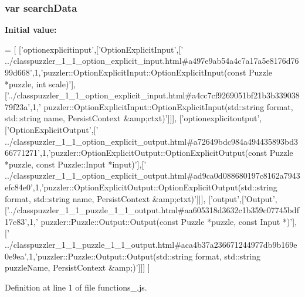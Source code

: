 \subsubsection[{search\+Data}]{\setlength{\rightskip}{0pt plus 5cm}var search\+Data}\label{a00091_ad01a7523f103d6242ef9b0451861231e}
{\bfseries Initial value\+:}
\begin{DoxyCode}
=
[
  [\textcolor{stringliteral}{'optionexplicitinput'},[\textcolor{stringliteral}{'OptionExplicitInput'},[\textcolor{stringliteral}{'
      ../classpuzzler\_1\_1\_option\_explicit\_input.html#a497e9ab54a4c7a17a5e8176d7699d668'},1,\textcolor{stringliteral}{'puzzler::OptionExplicitInput::OptionExplicitInput(const Puzzle *puzzle, int
       scale)'}],[\textcolor{stringliteral}{'../classpuzzler\_1\_1\_option\_explicit\_input.html#a4cc7cf9269051bf21b3b33903879f23a'},1,\textcolor{stringliteral}{'
      puzzler::OptionExplicitInput::OptionExplicitInput(std::string format, std::string name, PersistContext &amp;ctxt)'}]]],
  [\textcolor{stringliteral}{'optionexplicitoutput'},[\textcolor{stringliteral}{'OptionExplicitOutput'},[\textcolor{stringliteral}{'
      ../classpuzzler\_1\_1\_option\_explicit\_output.html#a72649bdc984a494435893bd366771271'},1,\textcolor{stringliteral}{'puzzler::OptionExplicitOutput::OptionExplicitOutput(const Puzzle *puzzle,
       const Puzzle::Input *input)'}],[\textcolor{stringliteral}{'
      ../classpuzzler\_1\_1\_option\_explicit\_output.html#ad9ca0d088680197c8162a7943efc84e0'},1,\textcolor{stringliteral}{'puzzler::OptionExplicitOutput::OptionExplicitOutput(std::string format, std::string name,
       PersistContext &amp;ctxt)'}]]],
  [\textcolor{stringliteral}{'output'},[\textcolor{stringliteral}{'Output'},[\textcolor{stringliteral}{'../classpuzzler\_1\_1\_puzzle\_1\_1\_output.html#aa605318d3632c1b359c07745bdf17e83'},1,\textcolor{stringliteral}{'
      puzzler::Puzzle::Output::Output(const Puzzle *puzzle, const Input *)'}],[\textcolor{stringliteral}{'
      ../classpuzzler\_1\_1\_puzzle\_1\_1\_output.html#aca4b37a236671244977db9b169e0e9ea'},1,\textcolor{stringliteral}{'puzzler::Puzzle::Output::Output(std::string format, std::string
       puzzleName, PersistContext &amp;)'}]]]
]
\end{DoxyCode}


Definition at line 1 of file functions\+\_.\+js.

